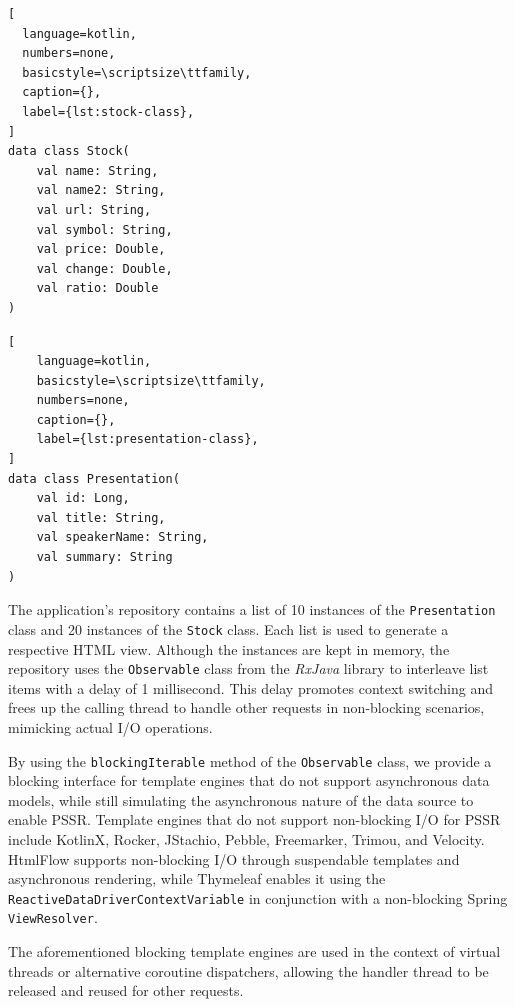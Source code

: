 \documentclass[software,article,accept,pdftex,moreauthors]{Definitions/mdpi}
\begin{document}
\begin{listing}[H]
\caption{\texttt{Stock} class.}
            \begin{lstlisting}[
  language=kotlin,
  numbers=none,
  basicstyle=\scriptsize\ttfamily,
  caption={},
  label={lst:stock-class},
]
data class Stock(
    val name: String,
    val name2: String,
    val url: String,
    val symbol: String,
    val price: Double, 
    val change: Double, 
    val ratio: Double
)
\end{lstlisting}
\end{listing}

\begin{listing}[H]
\caption{\texttt{Presentation} class.}
            \begin{lstlisting}[
    language=kotlin,
    basicstyle=\scriptsize\ttfamily,
    numbers=none,
    caption={},
    label={lst:presentation-class},
]
data class Presentation(
    val id: Long,
    val title: String, 
    val speakerName: String,
    val summary: String
)
\end{lstlisting}
\end{listing}

The application's repository contains a list of 10 instances of the
\texttt{Presentation} class and 20 instances of the \texttt{Stock} class. Each
list is used to generate a respective HTML view. Although the instances are
kept in memory, the repository uses the \texttt{Observable} class from the
\textit{RxJava} library to interleave list items with a delay of 1 millisecond.
This delay promotes context switching and frees up the calling thread to handle
other requests in non-blocking scenarios, mimicking actual I/O operations.

By using the \texttt{blockingIterable} method of the \texttt{Observable} class,
we provide a blocking interface for template engines that do not support
asynchronous data models, while still simulating the asynchronous nature of the
data source to enable PSSR\@. Template engines that do not support non-blocking
I/O for PSSR include KotlinX, Rocker, JStachio, Pebble, Freemarker, Trimou, and
Velocity. HtmlFlow supports non-blocking I/O through suspendable templates and
asynchronous rendering, while Thymeleaf enables it using the
\texttt{ReactiveDataDriverContextVariable} in conjunction with a non-blocking
Spring \texttt{ViewResolver}.

The aforementioned blocking template engines are used in the context of virtual
threads or alternative coroutine dispatchers, allowing the handler thread to be
released and reused for other requests.
\end{document}
